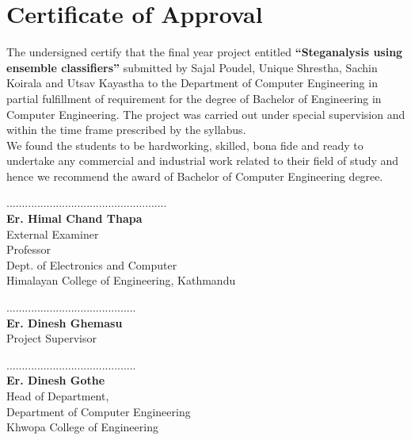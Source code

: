 \titleformat{\chapter}[display]{\normalfont\huge\bfseries\centering}{\chaptertitlename\ \thechapter}{20pt}{\Huge}
\chapter*{ Certificate of Approval}
\normalsize
\vspace{1cm}
The undersigned certify that the final year project entitled \textbf{“Steganalysis using ensemble classifiers”} submitted by Sajal Poudel, Unique Shrestha,
Sachin Koirala and Utsav Kayastha to the Department of Computer Engineering in partial fulfillment of requirement for
the degree of Bachelor of Engineering in Computer Engineering. The project was
carried out under special supervision and within the time frame prescribed by the
syllabus.
\\
We found the students to be hardworking, skilled, bona fide and ready to undertake any
commercial and industrial work related to their field of study and hence we recommend
the award of Bachelor of Computer Engineering degree.\\ 
\vspace{1in}
\begin{multicols}{2}
	\begin{center}
		....................................................\\
		\textbf{Er. Himal Chand Thapa }\\
		External Examiner\\
		Professor\\ 		
		Dept. of Electronics and Computer\\
		Himalayan College of Engineering, Kathmandu\\
		
	\end{center}
\columnbreak
	\begin{center}
		..........................................\\
		\textbf{Er. Dinesh Ghemasu}\\
		Project Supervisor\\

		
	\end{center}
\end{multicols}

\vspace{1in}
\begin{center}
	..........................................\\
	\textbf{Er. Dinesh Gothe}\\
	Head of Department,\\
	Department of Computer Engineering\\
	Khwopa College of Engineering
\end{center}
\pagebreak




